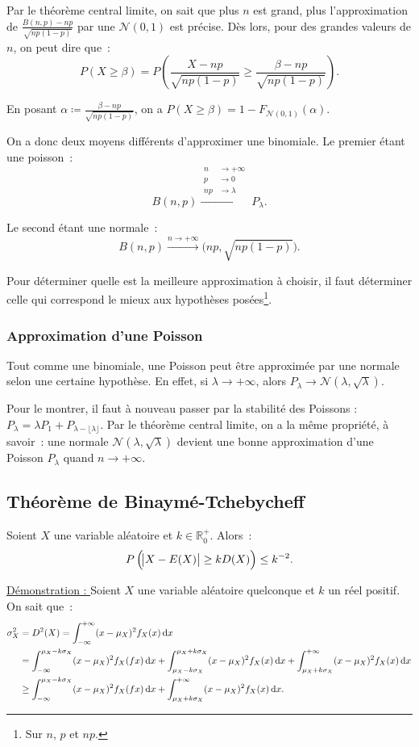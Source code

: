 \documentclass{article}
\newcommand{\Nzo}{\mathcal N(0, 1)}
\begin{document}
			Par le théorème central limite, on sait que plus $n$ est grand, plus l'approximation de $\frac {B(n, p)-np}{\sqrt {np(1-p)}}$ par une $\Nzo$ est précise. Dès
			lors, pour des grandes valeurs de $n$, on peut dire que~:
			\[P(X \geq \beta) = P\left(\frac {X-np}{\sqrt {np(1-p)}} \geq \frac {\beta - np}{\sqrt {np(1-p)}}\right).\]

			En posant $\alpha \coloneqq \frac {\beta - np}{\sqrt {np(1-p)}}$, on a $P(X \geq \beta) = 1 - F_{\Nzo}(\alpha)$.

			On a donc deux moyens différents d'approximer une binomiale. Le premier étant une poisson~:
			\[B(n, p) \stackrel{\begin{aligned}n&\to+\infty\\p&\to0\\np&\to\lambda\end{aligned}}{\longrightarrow}P_\lambda.\]

			Le second étant une normale~:
			\[B(n, p) \stackrel{n\to+\infty}{\longrightarrow}\mathcal(np, \sqrt {np(1-p)}).\]

			Pour déterminer quelle est la meilleure approximation à choisir, il faut déterminer celle qui correspond le mieux aux hypothèses
			posées\footnote{Sur $n$, $p$ et $np$.}.

		\subsubsection{Approximation d'une Poisson}
			Tout comme une binomiale, une Poisson peut être approximée par une normale selon une certaine hypothèse. En effet, si $\lambda \to +\infty$, alors
			$P_\lambda \to \mathcal N(\lambda, \sqrt \lambda)$.

			Pour le montrer, il faut à nouveau passer par la stabilité des Poissons : $P_\lambda = \lambda P_1 + P_{\lambda-\lfloor\lambda\rfloor}$. Par le théorème
			central limite, on a la même propriété, à savoir~: une normale $\mathcal N(\lambda, \sqrt \lambda)$ devient une bonne approximation d'une Poisson
			$P_\lambda$ quand $n \to +\infty$.

	\subsection{Théorème de Binaymé-Tchebycheff}
		Soient $X$ une variable aléatoire et $k \in \mathbb R_0^+$. Alors~:
		\[P\left(\abs{X-E(X)} \geq kD(X)\right) \leq k^{-2}.\]

		\underline{Démonstration : } Soient $X$ une variable aléatoire quelconque et $k$ un réel positif. On sait que~:
		\begin{align*}
			\sigma_X^2 &= D^2(X) = \int_{-\infty}^{+\infty}(x-\mu_X)^2f_X(x)\dif x \\
			&= \int_{-\infty}^{\mu_X-k\sigma_X} (x-\mu_X)^2f_X(fx)\dif x + \int_{\mu_X - k\sigma_X}^{\mu_X + k\sigma_X}(x-\mu_X)^2f_X(x)\dif x
				+ \int_{\mu_X + k\sigma_X}^{+\infty}(x-\mu_X)^2f_X(x)\dif x \\
			&\geq \int_{-\infty}^{\mu_X-k\sigma_X}(x-\mu_X)^2f_X(fx)\dif x + \int_{\mu_X + k\sigma_X}^{+\infty}(x-\mu_X)^2f_X(x)\dif x.
		\end{align*}
\end{document}
